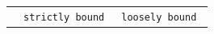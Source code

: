 \documentclass[a4paper,twocolumn,fleqn,usenatbib]{mnras}
\newcommand{\sad}{\texttt{strictly bound}}
\newcommand{\nosad}{\texttt{loosely bound}}
\providecommand{\DIFaddbeginFL}{} %
\providecommand{\DIFdelendFL}{} %
\newcommand{\DIFaddincludegraphics}[2][]{{\color{blue}\fbox{\DIFOincludegraphics[#1]{#2}}}} %
\DeclareRobustCommand{\DIFaddbeginFL}{\DIFOaddbeginFL \let\includegraphics\DIFaddincludegraphics} %
\DeclareRobustCommand{\DIFdelendFL}{\DIFOaddendFL \let\includegraphics\DIFOincludegraphics} %
\begin{document}
\begin{table}
\DIFdelendFL \DIFaddbeginFL 

	{\small 
		\begin{tabular}[c]{l | p{2.8cm} | p{2.8cm} |}
													&	 \sad\  &   \nosad\ \\ 


\end{tabular}}
\end{table}
\end{document}
